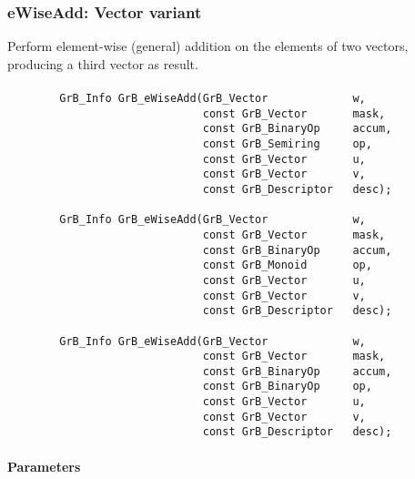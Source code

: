 
\subsubsection{{\sf eWiseAdd}: Vector variant}

Perform element-wise (general) addition on the elements of two vectors,
producing a third vector as result.

\paragraph{\syntax}

\begin{verbatim}
        GrB_Info GrB_eWiseAdd(GrB_Vector             w,
                              const GrB_Vector       mask,
                              const GrB_BinaryOp     accum,
                              const GrB_Semiring     op, 
                              const GrB_Vector       u,
                              const GrB_Vector       v,
                              const GrB_Descriptor   desc);
                            
        GrB_Info GrB_eWiseAdd(GrB_Vector             w,
                              const GrB_Vector       mask,
                              const GrB_BinaryOp     accum,
                              const GrB_Monoid       op, 
                              const GrB_Vector       u,
                              const GrB_Vector       v,
                              const GrB_Descriptor   desc);

        GrB_Info GrB_eWiseAdd(GrB_Vector             w,
                              const GrB_Vector       mask,
                              const GrB_BinaryOp     accum,
                              const GrB_BinaryOp     op, 
                              const GrB_Vector       u,
                              const GrB_Vector       v,
                              const GrB_Descriptor   desc);
\end{verbatim}

\paragraph{Parameters}

